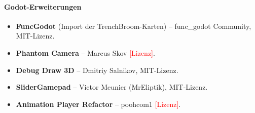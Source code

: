 \documentclass[../Main.tex]{subfiles}
\begin{document}
\paragraph{Godot-Erweiterungen}
\begin{itemize}[leftmargin=1.5cm]
    \item \textbf{FuncGodot} (Import der TrenchBroom-Karten) -- func\_godot Community, MIT-Lizenz.
    \item \textbf{Phantom Camera} -- Marcus Skov \textcolor{red}{[Lizenz]}.
    \item \textbf{Debug Draw 3D} -- Dmitriy Salnikov, MIT-Lizenz.
    \item \textbf{SliderGamepad} -- Victor Meunier (MrEliptik), MIT-Lizenz.
    \item \textbf{Animation Player Refactor} -- poohcom1 \textcolor{red}{[Lizenz]}.
\end{itemize}
\end{document}
